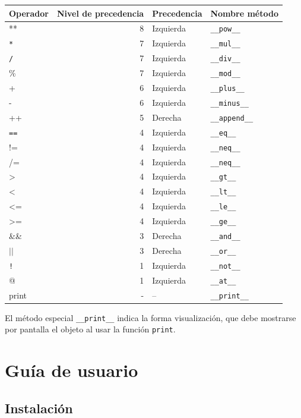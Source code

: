 \documentclass[11pt]{article}
\begin{document}
\begin{center}
\begin{tabular}{lrll}
Operador & Nivel de precedencia & Precedencia & Nombre método\\
\hline
** & 8 & Izquierda & \texttt{\_\_pow\_\_}\\
\texttt{*} & 7 & Izquierda & \texttt{\_\_mul\_\_}\\
\texttt{/} & 7 & Izquierda & \texttt{\_\_div\_\_}\\
\% & 7 & Izquierda & \texttt{\_\_mod\_\_}\\
+ & 6 & Izquierda & \texttt{\_\_plus\_\_}\\
- & 6 & Izquierda & \texttt{\_\_minus\_\_}\\
++ & 5 & Derecha & \texttt{\_\_append\_\_}\\
\texttt{==} & 4 & Izquierda & \texttt{\_\_eq\_\_}\\
!= & 4 & Izquierda & \texttt{\_\_neq\_\_}\\
/= & 4 & Izquierda & \texttt{\_\_neq\_\_}\\
> & 4 & Izquierda & \texttt{\_\_gt\_\_}\\
< & 4 & Izquierda & \texttt{\_\_lt\_\_}\\
<= & 4 & Izquierda & \texttt{\_\_le\_\_}\\
>= & 4 & Izquierda & \texttt{\_\_ge\_\_}\\
\&\& & 3 & Derecha & \texttt{\_\_and\_\_}\\
\(\vert{} \vert{}\) & 3 & Derecha & \texttt{\_\_or\_\_}\\
\texttt{!} & 1 & Izquierda & \texttt{\_\_not\_\_}\\
@ & 1 & Izquierda & \texttt{\_\_at\_\_}\\
print & - & -- & \texttt{\_\_print\_\_}\\
\end{tabular}
\end{center}


El método especial \texttt{\_\_print\_\_} indica la forma visualización, que debe mostrarse por pantalla el objeto al usar la función \texttt{print}.


\section{Guía de usuario}
\label{sec:org7275f4f}

\subsection{Instalación}
\label{sec:orgb08e7cd}
\end{document}
